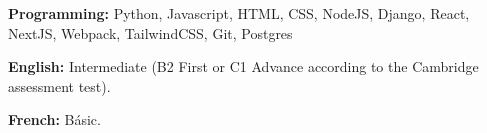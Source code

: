 

\begin{cvpubs}

  \cvpub
    {
      \begin{cvlist}
        \item{\textbf{Programming:} Python, Javascript, HTML, CSS, NodeJS, Django, React, NextJS, Webpack, TailwindCSS, Git, Postgres }
        \item{\textbf{English:} Intermediate (B2 First or C1 Advance according to the Cambridge assessment test). }
        \item{\textbf{French:} Básic. }
      \end{cvlist}
    }\vspace{-4pt}
\end{cvpubs}